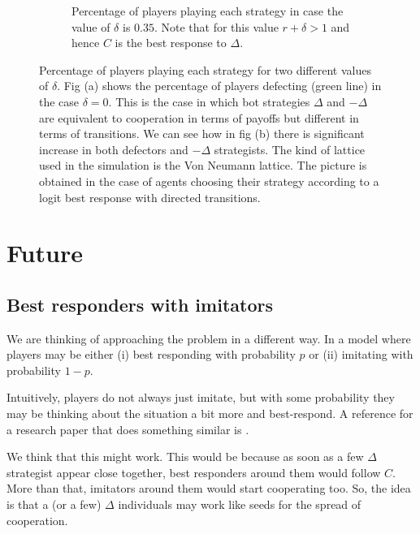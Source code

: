 \documentclass{article}
\begin{document}
\begin{figure}[htbp]
\begin{subfigure}[t]{0.47\textwidth}
  \caption{Percentage of players playing each strategy in case the value of $\delta$ is $0.35$. Note that for this value $r+\delta >1$ and hence $C$ is the best response to $\Delta$.}
  \label{fig:4strat_delta} 
\end{subfigure}
\caption{Percentage of players playing each strategy for two different values of $\delta$.
Fig (a) shows the percentage of players defecting (green line) in the case $\delta =0$. This is the case in which bot strategies $\Delta$ and $-\Delta$ are equivalent to cooperation in terms of payoffs but different in terms of transitions.
We can see how in fig (b) there is significant increase in both defectors and $-\Delta$ strategists.
The kind of lattice used in the simulation is the Von Neumann lattice.
The picture is obtained in the case of agents choosing their strategy according to a logit best response with directed transitions.
}
\label{fig:4strat}
\end{figure} 


\section{Future}

\subsection{Best responders with imitators}
We are thinking of approaching the problem in a different way. In a model where players may be either (i) best responding with probability $p$ or (ii) imitating with probability $1-p$. 

Intuitively, players do not always just imitate, but with some probability they may be thinking about the situation a bit more and best-respond. A reference for a research paper that does something similar is \citet{DziubinskiRoy2012}.

We think that this might work. This would be because as soon as a few $\Delta$ strategist appear close together, best responders around them would follow $C$. More than that, imitators around them would start cooperating too. So, the idea is that a (or a few) $\Delta$ individuals may work like seeds for the spread of cooperation.



\end{document}
